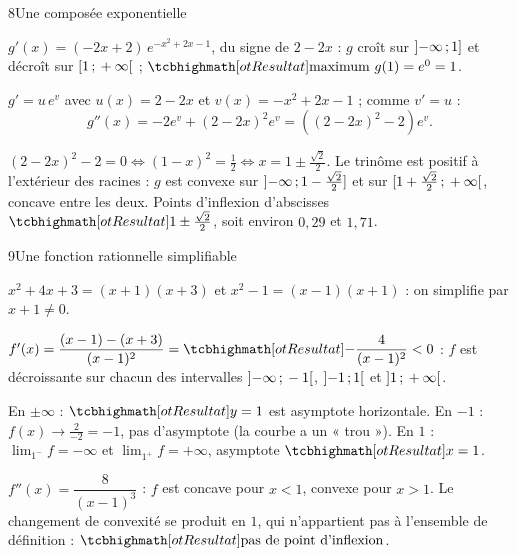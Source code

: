 \begin{corrige}{8}{Une composée exponentielle}
\begin{questions}
  \item $g'(x)=(-2x+2)\,e^{-x^{2}+2x-1}$, du signe de $2-2x$ : $g$ croît sur $\mathopen{]}-\infty\,{;}\,1\mathclose{]}$ et décroît sur
    $\mathopen{[}1\,{;}\,+\infty\mathclose{[}$ ; $\res{\text{maximum }g(1)=e^{0}=1}$.
  \item $g'=u\,e^{v}$ avec $u(x)=2-2x$ et $v(x)=-x^{2}+2x-1$ ; comme $v'=u$ :
    \[ g''(x)=-2e^{v}+(2-2x)^{2}e^{v}=\left((2-2x)^{2}-2\right)e^{v}. \]
  \item $(2-2x)^{2}-2=0\iff(1-x)^{2}=\frac12\iff x=1\pm\frac{\sqrt2}{2}$. Le trinôme est positif à l'extérieur des racines :
    $g$ est convexe sur $\mathopen{]}-\infty\,{;}\,1-\frac{\sqrt2}{2}\mathclose{]}$ et sur $\mathopen{[}1+\frac{\sqrt2}{2}\,{;}\,+\infty\mathclose{[}$, concave entre les deux.
    Points d'inflexion d'abscisses $\res{1\pm\frac{\sqrt2}{2}}$, soit environ $0{,}29$ et $1{,}71$.
\end{questions}
\end{corrige}

\begin{corrige}{9}{Une fonction rationnelle simplifiable}
\begin{questions}
  \item $x^{2}+4x+3=(x+1)(x+3)$ et $x^{2}-1=(x-1)(x+1)$ : on simplifie par $x+1\neq0$.
  \item $f'(x)=\dfrac{(x-1)-(x+3)}{(x-1)^{2}}=\res{-\dfrac{4}{(x-1)^{2}}}<0$ : $f$ est décroissante sur chacun des intervalles
    $\mathopen{]}-\infty\,{;}\,-1\mathclose{[}$, $\mathopen{]}-1\,{;}\,1\mathclose{[}$ et $\mathopen{]}1\,{;}\,+\infty\mathclose{[}$.
  \item En $\pm\infty$ : $\res{y=1}$ est asymptote horizontale. En $-1$ : $f(x)\to\frac{2}{-2}=-1$, pas d'asymptote
    (la courbe a un « trou »). En $1$ : $\lim_{1^{-}}f=-\infty$ et $\lim_{1^{+}}f=+\infty$, asymptote $\res{x=1}$.
  \item $f''(x)=\dfrac{8}{(x-1)^{3}}$ : $f$ est concave pour $x<1$, convexe pour $x>1$. Le changement de convexité se
    produit en $1$, qui n'appartient pas à l'ensemble de définition : $\res{\text{pas de point d'inflexion}}$.
\end{questions}
\end{corrige}

